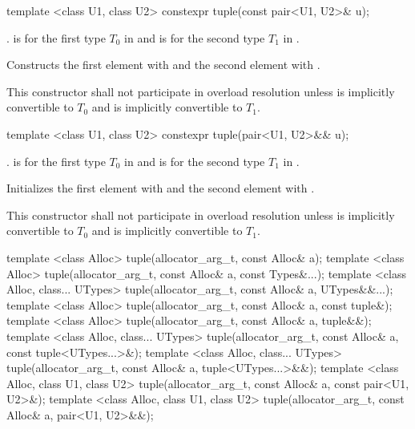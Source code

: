 %
%
\begin{itemdecl}
template <class U1, class U2> constexpr tuple(const pair<U1, U2>& u);
\end{itemdecl}

\begin{itemdescr}
\pnum
\requires {}.
 is  for the first type
$T_0$ in  and
 is  for the second type
$T_1$ in .

\pnum
\effects  Constructs the first element with  and the
second element with .

\pnum
\remark This constructor shall not participate in overload resolution unless
 is implicitly convertible to $T_0$ and 
is implicitly convertible to $T_1$.
\end{itemdescr}

%
%
\begin{itemdecl}
template <class U1, class U2> constexpr tuple(pair<U1, U2>&& u);
\end{itemdecl}

\begin{itemdescr}
\pnum
\requires {}.
 is  for the first type
$T_0$ in  and
 is  for the second type
$T_1$ in .


\pnum
\effects Initializes the first element with
 and the
second element with .

\pnum
\remark This constructor shall not participate in overload resolution unless
 is implicitly convertible to $T_0$ and 
is implicitly convertible to $T_1$.
\end{itemdescr}

%
\begin{itemdecl}
template <class Alloc>
  tuple(allocator_arg_t, const Alloc& a);
template <class Alloc>
  tuple(allocator_arg_t, const Alloc& a, const Types&...);
template <class Alloc, class... UTypes>
  tuple(allocator_arg_t, const Alloc& a, UTypes&&...);
template <class Alloc>
  tuple(allocator_arg_t, const Alloc& a, const tuple&);
template <class Alloc>
  tuple(allocator_arg_t, const Alloc& a, tuple&&);
template <class Alloc, class... UTypes>
  tuple(allocator_arg_t, const Alloc& a, const tuple<UTypes...>&);
template <class Alloc, class... UTypes>
  tuple(allocator_arg_t, const Alloc& a, tuple<UTypes...>&&);
template <class Alloc, class U1, class U2>
  tuple(allocator_arg_t, const Alloc& a, const pair<U1, U2>&);
template <class Alloc, class U1, class U2>
  tuple(allocator_arg_t, const Alloc& a, pair<U1, U2>&&);
\end{itemdecl}

